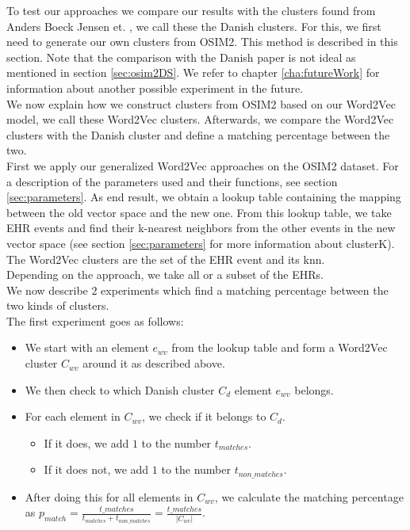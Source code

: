 To test our approaches we compare our results with the clusters found from Anders Boeck Jensen et. \cite{Brunak:article}, we call these the Danish clusters. For this, we first need to generate our own clusters from OSIM2. This method is described in this section. Note that the comparison with the Danish paper is not ideal as mentioned in section \ref{sec:osim2DS}. We refer to chapter \ref{cha:futureWork} for information about another possible experiment in the future. \\

We now explain how we construct clusters from OSIM2 based on our Word2Vec model, we call these Word2Vec clusters. Afterwards, we compare the Word2Vec clusters with the Danish cluster and define a matching percentage between the two. \\

First we apply our generalized Word2Vec approaches on the OSIM2 dataset. For a description of the parameters used and their functions, see section \ref{sec:parameters}. As end result, we obtain a lookup table containing the mapping between the old vector space and the new one. From this lookup table, we take EHR events and find their k-nearest neighbors from the other events in the new vector space (see section \ref{sec:parameters} for more information about clusterK). The Word2Vec clusters are the set of the EHR event and its knn. \\
Depending on the approach, we take all or a subset of the EHRs. \\

We now describe $2$ experiments which find a matching percentage between the two kinds of clusters. \\
The first experiment goes as follows:

\begin{itemize}

\item We start with an element $e_{wv}$ from the lookup table and form a Word2Vec cluster $C_{wv}$ around it as described above.
\item We then check to which Danish cluster $C_d$ element $e_{wv}$ belongs.
\item For each element in $C_{wv}$, we check if it belongs to $C_d$.
\begin{itemize}
\item If it does, we add $1$ to the number $t_{matches}$.
\item If it does not, we add $1$ to the number $t_{non\_matches}$.
\end{itemize}
\item After doing this for all elements in $C_{wv}$, we calculate the matching percentage as $p_{match} = \frac{t\_{matches}}{t_{matches} + t_{non\_matches}} = \frac{t\_{matches}}{\left| C_{wv} \right|}$.

\end{itemize}

